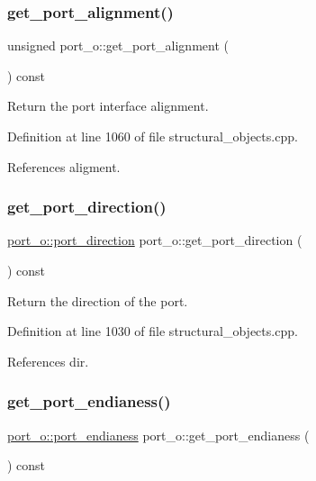 \subsubsection{\texorpdfstring{get\+\_\+port\+\_\+alignment()}{get\_port\_alignment()}}
{\footnotesize\ttfamily unsigned port\+\_\+o\+::get\+\_\+port\+\_\+alignment (\begin{DoxyParamCaption}{ }\end{DoxyParamCaption}) const}



Return the port interface alignment. 



Definition at line 1060 of file structural\+\_\+objects.\+cpp.



References aligment.

\mbox{\label{structport__o_a753a6075fd5a4728732e0719d34c914c}} 
\subsubsection{\texorpdfstring{get\+\_\+port\+\_\+direction()}{get\_port\_direction()}}
{\footnotesize\ttfamily \hyperlink{structport__o_adb254df5665ff28b0769491cc3899fd5}{port\+\_\+o\+::port\+\_\+direction} port\+\_\+o\+::get\+\_\+port\+\_\+direction (\begin{DoxyParamCaption}{ }\end{DoxyParamCaption}) const}



Return the direction of the port. 



Definition at line 1030 of file structural\+\_\+objects.\+cpp.



References dir.

\mbox{\label{structport__o_a7adbc2daad0ee797ff897b0c3453516d}} 
\subsubsection{\texorpdfstring{get\+\_\+port\+\_\+endianess()}{get\_port\_endianess()}}
{\footnotesize\ttfamily \hyperlink{structport__o_a7f16c53245215df0064e1b8ef27a36e3}{port\+\_\+o\+::port\+\_\+endianess} port\+\_\+o\+::get\+\_\+port\+\_\+endianess (\begin{DoxyParamCaption}{ }\end{DoxyParamCaption}) const}



